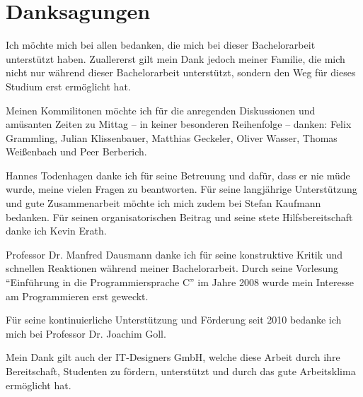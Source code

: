 
\chapter*{Danksagungen}

Ich möchte mich bei allen bedanken, die mich bei dieser Bachelorarbeit unterstützt haben.
Zuallererst gilt mein Dank jedoch meiner Familie, die mich nicht nur während dieser Bachelorarbeit unterstützt, sondern den Weg für dieses Studium erst ermöglicht hat.

Meinen Kommilitonen möchte ich für die anregenden Diskussionen und amüsanten Zeiten zu Mittag -- in keiner besonderen Reihenfolge -- danken:
Felix Grammling,
Julian Klissenbauer,
Matthias Geckeler,
Oliver Wasser,
Thomas Weißenbach und
Peer Berberich.



Hannes Todenhagen danke ich für seine Betreuung und dafür, dass er nie müde wurde, meine vielen Fragen zu beantworten.
Für seine langjährige Unterstützung und gute Zusammenarbeit möchte ich mich zudem bei Stefan Kaufmann bedanken.
Für seinen organisatorischen Beitrag und seine stete Hilfsbereitschaft danke ich Kevin Erath.

Professor Dr. Manfred Dausmann danke ich für seine konstruktive Kritik und schnellen Reaktionen während meiner Bachelorarbeit. Durch seine Vorlesung \enquote{Einführung in die Programmiersprache C} im Jahre 2008 wurde mein Interesse am Programmieren erst geweckt.


Für seine kontinuierliche Unterstützung und Förderung seit 2010 bedanke ich mich bei Professor Dr. Joachim Goll.

Mein Dank gilt auch der IT-Designers GmbH, welche diese Arbeit durch ihre Bereitschaft, Studenten zu fördern, unterstützt und durch das gute Arbeitsklima ermöglicht hat.
